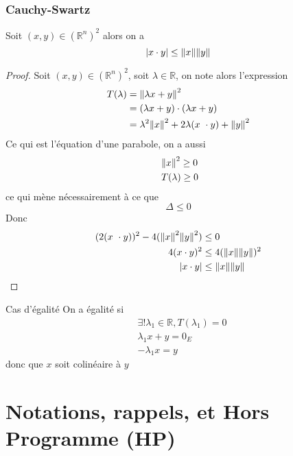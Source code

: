 \documentclass[11pt,colorlinks]{book}
\theoremstyle{mytheoremstyle}
\theoremstyle{mytheoremstyle}
\theoremstyle{mytheoremstyle}
\theoremstyle{mytheoremstyle}
\theoremstyle{mytheoremstyle}
\theoremstyle{mytheoremstyle}
\theoremstyle{mytheoremstyle}
\theoremstyle{mytheoremstyle}
\theoremstyle{myproblemstyle}
\def\mbb#1{\mathbb{#1}}
\def\bR{\mbb{R}}
\begin{document}
\subsection{Cauchy-Swartz}
\begin{theorem}
  Soit $(x,y) \in \left(\bR^n\right)^2$ alors on a 
  \begin{equation*}
    \abs{x \cdot y} \leq \norm{x} \norm{y}
  \end{equation*}
  \begin{proof}
    Soit $(x,y) \in \left(\bR^n\right)^2$, soit $\lambda \in \bR$, on note alors l'expression
    \begin{align*}
      T(\lambda) &= \norm{\lambda x + y}^2 \\ 
      &=\left(\lambda x + y\right) \cdot \left(\lambda x + y\right) \\ 
      &=\lambda^2\norm{x}^2 + 2\lambda (x \cdot y) + \norm{y}^2
    \end{align*}
  Ce qui est l'équation d'une parabole, on a aussi 
  \begin{align*}
    &\norm{x}^2 \geq 0 \\ 
    &T(\lambda) \geq 0
  \end{align*}
  ce qui mène nécessairement à ce que 
  \begin{equation*}
    \Delta \leq 0
  \end{equation*}
  Donc 
  \begin{align*}
    (2(x \cdot y))^2 - 4(\norm{x}^2\norm{y}^2) &\leq 0 \\ 
    4(x\cdot y)^2 &\leq 4(\norm{x}\norm{y})^2 \\ 
    \abs{x \cdot y} &\leq \norm{x}\norm{y}
  \end{align*}
  \end{proof}
\end{theorem}
\begin{prop}{Cas d'égalité}
  On a égalité si 
  \begin{align*}
    &\exists! \lambda_1 \in \bR, T(\lambda_1) = 0 \\ 
    &\lambda_1 x + y = 0_E \\ 
    &-\lambda_1 x = y
  \end{align*}
  donc que $x$ soit colinéaire à $y$
\end{prop}

\chapter{Notations, rappels, et Hors Programme (HP)}
\end{document}
